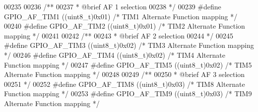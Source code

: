 \begin{DoxyCode}
00235 
00236 \textcolor{comment}{/** }
00237 \textcolor{comment}{  * @brief   AF 1 selection  }
00238 \textcolor{comment}{  */}
00239 \textcolor{preprocessor}{#}\textcolor{preprocessor}{define} \textcolor{preprocessor}{GPIO\_AF\_TIM1}          \textcolor{preprocessor}{(}\textcolor{preprocessor}{(}\textcolor{preprocessor}{uint8\_t}\textcolor{preprocessor}{)}0x01\textcolor{preprocessor}{)}  \textcolor{comment}{/* TIM1 Alternate Function mapping */}
00240 \textcolor{preprocessor}{#}\textcolor{preprocessor}{define} \textcolor{preprocessor}{GPIO\_AF\_TIM2}          \textcolor{preprocessor}{(}\textcolor{preprocessor}{(}\textcolor{preprocessor}{uint8\_t}\textcolor{preprocessor}{)}0x01\textcolor{preprocessor}{)}  \textcolor{comment}{/* TIM2 Alternate Function mapping */}
00241 
00242 \textcolor{comment}{/** }
00243 \textcolor{comment}{  * @brief   AF 2 selection  }
00244 \textcolor{comment}{  */}
00245 \textcolor{preprocessor}{#}\textcolor{preprocessor}{define} \textcolor{preprocessor}{GPIO\_AF\_TIM3}          \textcolor{preprocessor}{(}\textcolor{preprocessor}{(}\textcolor{preprocessor}{uint8\_t}\textcolor{preprocessor}{)}0x02\textcolor{preprocessor}{)}  \textcolor{comment}{/* TIM3 Alternate Function mapping */}
00246 \textcolor{preprocessor}{#}\textcolor{preprocessor}{define} \textcolor{preprocessor}{GPIO\_AF\_TIM4}          \textcolor{preprocessor}{(}\textcolor{preprocessor}{(}\textcolor{preprocessor}{uint8\_t}\textcolor{preprocessor}{)}0x02\textcolor{preprocessor}{)}  \textcolor{comment}{/* TIM4 Alternate Function mapping */}
00247 \textcolor{preprocessor}{#}\textcolor{preprocessor}{define} \textcolor{preprocessor}{GPIO\_AF\_TIM5}          \textcolor{preprocessor}{(}\textcolor{preprocessor}{(}\textcolor{preprocessor}{uint8\_t}\textcolor{preprocessor}{)}0x02\textcolor{preprocessor}{)}  \textcolor{comment}{/* TIM5 Alternate Function mapping */}
00248 
00249 \textcolor{comment}{/** }
00250 \textcolor{comment}{  * @brief   AF 3 selection  }
00251 \textcolor{comment}{  */}
00252 \textcolor{preprocessor}{#}\textcolor{preprocessor}{define} \textcolor{preprocessor}{GPIO\_AF\_TIM8}          \textcolor{preprocessor}{(}\textcolor{preprocessor}{(}\textcolor{preprocessor}{uint8\_t}\textcolor{preprocessor}{)}0x03\textcolor{preprocessor}{)}  \textcolor{comment}{/* TIM8 Alternate Function mapping */}
00253 \textcolor{preprocessor}{#}\textcolor{preprocessor}{define} \textcolor{preprocessor}{GPIO\_AF\_TIM9}          \textcolor{preprocessor}{(}\textcolor{preprocessor}{(}\textcolor{preprocessor}{uint8\_t}\textcolor{preprocessor}{)}0x03\textcolor{preprocessor}{)}  \textcolor{comment}{/* TIM9 Alternate Function mapping */}

\end{DoxyCode}
